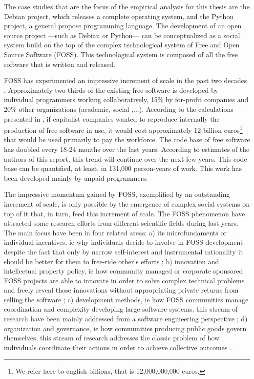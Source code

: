 The case studies that are the focus of the empirical analysis for this thesis are the Debian project, which releases a complete operating system, and the Python project, a general propose programming language. The development of an open source project ---such as Debian or Python--- can be conceptualized as a social system build on the top of the complex technological system of Free and Open Source Software (FOSS). This technological system is composed of all the free software that is written and released.

FOSS has experimented an impressive increment of scale in the past two decades \citep{ghosh:2006}. Approximately two thirds of the existing free software is developed by individual programmers working collaboratively, 15\% by for-profit companies and 20\% other organizations (academic, social ,...). According to the calculations presented in \citet{ghosh:2006}, if capitalist companies wanted to reproduce internally the production of free software in use, it would cost approximately 12 billion euros\footnote{We refer here to english billions, that is 12,000,000,000 euros.} that would be used primarily to pay the workforce. The code base of free software has doubled every 18-24 months over the last years. According to estimates of the authors of this report, this trend will continue over the next few years. This code base can be quantified, at least, in 131,000 person-years of work. This work has been developed mainly by unpaid programmers.

The impressive momentum gained by FOSS, exemplified by an outstanding increment of scale, is only possible by the emergence of complex social systems on top of it that, in turn, feed this increment of scale. The FOSS phenomenon have attracted some research efforts from different scientific fields during last years. The main focus have been in four related areas: a) its microfundaments or individual incentives, ie why individuals decide to involve in FOSS development despite the fact that only by narrow self-interest and instrumental rationality it should be better for them to free-ride other's efforts \citep{hars:2002,lakhani:2003,hertel:2003,weber:2004,roberts:2006}; b) innovation and intellectual property policy, ie how community managed or corporate sponsored FOSS projects are able to innovate in order to solve complex technical problems and freely reveal those innovations without appropriating private returns from selling the software \citep{kogut:2001,hippel:2001,hippel:2003,vonKrogh2003,omahony:2003,west:2003,lerner:2005,hargrave:2006,west:2008}; c) development methods, ie how FOSS communities manage coordination and complexity developing large software systems, this stream of research have been mainly addressed from a software engineering perspective \citep{godfrey:2000,feller:2000,mockus:2002,koch:2002,weber:2004,maccormack:2006}; d) organization and governance, ie how communities producing public goods govern themselves, this stream of research addresses the classic problem of how individuals coordinate their actions in order to achieve collective outcomes \citep{ljungberg:2000,omahony:2007,west:2008}.

